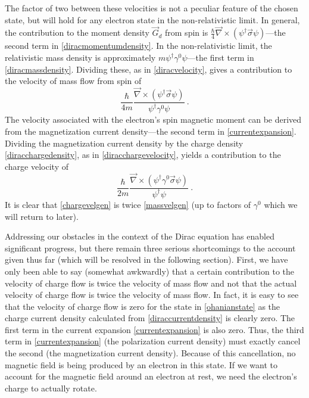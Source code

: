 \documentclass[onecolumn,secnumarabic,amsmath,amssymb,balancelastpage,nofootinbib]{article}
\begin{document}
The factor of two between these velocities is not a peculiar feature of the chosen state, but will hold for any electron state in the non-relativistic limit.  In general, the contribution to the moment density $\vec{G}_d$ from spin is $\frac{\hbar}{4}\vec{\nabla}\times(\psi^\dagger \vec{\sigma} \psi)$---the second term in \eqref{diracmomentumdensity}.  In the non-relativistic limit, the relativistic mass density is approximately $m \psi^\dagger\gamma^0\psi$---the first term in \eqref{diracmassdensity}.  Dividing these, as in \eqref{diracvelocity}, gives a contribution to the velocity of mass flow from spin of
\begin{equation}
\frac{\hbar}{4 m} \frac{\vec{\nabla}\times(\psi^\dagger \vec{\sigma} \psi)}{\psi^\dagger\gamma^0\psi}\ .
\label{massvelgen}
\end{equation}
The velocity associated with the electron's spin magnetic moment can be derived from the magnetization current density---the second term in \eqref{currentexpansion}.  Dividing the magnetization current density by the charge density \eqref{diracchargedensity}, as in \eqref{diracchargevelocity}, yields a contribution to the charge velocity of
\begin{equation}
\frac{\hbar}{2 m} \frac{\vec{\nabla}\times(\psi^\dagger \gamma^0\vec{\sigma} \psi)}{\psi^\dagger\psi}\ .
\label{chargevelgen}
\end{equation}
It is clear that \eqref{chargevelgen} is twice \eqref{massvelgen} (up to factors of $\gamma^0$ which we will return to later).


Addressing our obstacles in the context of the Dirac equation has enabled significant progress, but there remain three serious shortcomings to the account given thus far (which will be resolved in the following section).  First, we have only been able to say (somewhat awkwardly) that a certain contribution to the velocity of charge flow is twice the velocity of mass flow and not that the actual velocity of charge flow is twice the velocity of mass flow.  In fact, it is easy to see that the velocity of charge flow is zero for the state in \eqref{ohanianstate} as the charge current density calculated from \eqref{diraccurrentdensity} is clearly zero.  The first term in the current expansion \eqref{currentexpansion} is also zero.  Thus, the third term in \eqref{currentexpansion} (the polarization current density) must exactly cancel the second (the magnetization current density).  Because of this cancellation, no magnetic field is being produced by an electron in this state.  If we want to account for the magnetic field around an electron at rest, we need the electron's charge to actually rotate.
\end{document}
